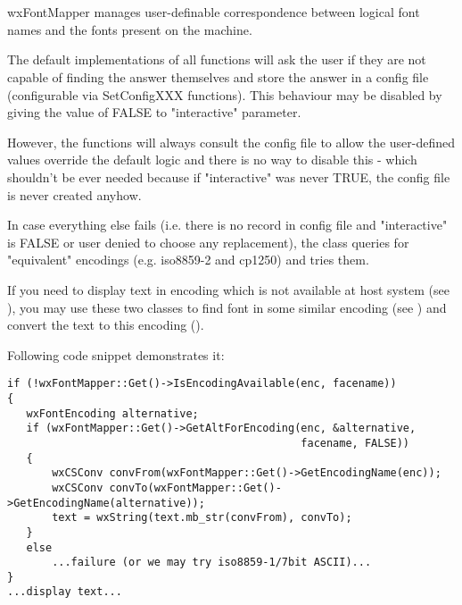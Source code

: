 %
%

\section{}\label{wxfontmapper}

wxFontMapper manages user-definable correspondence between logical font
names and the fonts present on the machine.

The default implementations of all functions will ask the user if they are
not capable of finding the answer themselves and store the answer in a
config file (configurable via SetConfigXXX functions). This behaviour may
be disabled by giving the value of FALSE to "interactive" parameter.

However, the functions will always consult the config file to allow the
user-defined values override the default logic and there is no way to
disable this - which shouldn't be ever needed because if "interactive" was
never TRUE, the config file is never created anyhow.

In case everything else fails (i.e. there is no record in config file
and "interactive" is FALSE or user denied to choose any replacement), 
the class queries  
for "equivalent" encodings (e.g. iso8859-2 and cp1250) and tries them.


If you need to display text in encoding which is not available at
host system (see ),
you may use these two classes to find font in some similar encoding
(see )
and convert the text to this encoding 
().

Following code snippet demonstrates it:

\begin{verbatim}
if (!wxFontMapper::Get()->IsEncodingAvailable(enc, facename))
{
   wxFontEncoding alternative;
   if (wxFontMapper::Get()->GetAltForEncoding(enc, &alternative,
                                              facename, FALSE))
   {
       wxCSConv convFrom(wxFontMapper::Get()->GetEncodingName(enc));
       wxCSConv convTo(wxFontMapper::Get()->GetEncodingName(alternative));
       text = wxString(text.mb_str(convFrom), convTo);
   }
   else
       ...failure (or we may try iso8859-1/7bit ASCII)...
}
...display text...
\end{verbatim}



